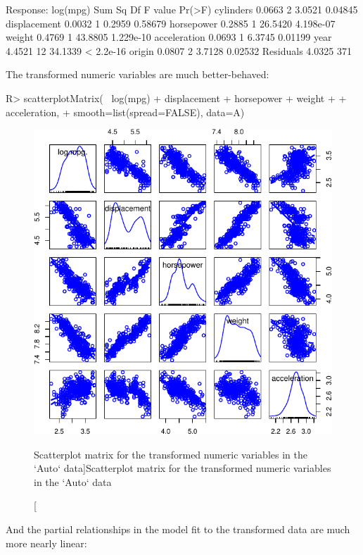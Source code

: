\documentclass[
]{jss}
\begin{document}
\begin{CodeChunk}
\begin{CodeOutput}
Response: log(mpg)
             Sum Sq  Df F value    Pr(>F)
cylinders    0.0663   2  3.0521   0.04845
displacement 0.0032   1  0.2959   0.58679
horsepower   0.2885   1 26.5420 4.198e-07
weight       0.4769   1 43.8805 1.229e-10
acceleration 0.0693   1  6.3745   0.01199
year         4.4521  12 34.1339 < 2.2e-16
origin       0.0807   2  3.7128   0.02532
Residuals    4.0325 371                  
\end{CodeOutput}
\end{CodeChunk}

The transformed numeric variables are much better-behaved:

\begin{CodeChunk}
\begin{CodeInput}
R> scatterplotMatrix(~ log(mpg) + displacement + horsepower + weight 
+                   + acceleration, 
+                   smooth=list(spread=FALSE), data=A)
\end{CodeInput}
\begin{figure}

{\centering \includegraphics[width=0.6\linewidth]{JSS-article-reduced_files/figure-latex/Auto-transformed-scatterplot-matrix-1} 

}

\caption[Scatterplot matrix for the transformed numeric variables in the `Auto` data]{Scatterplot matrix for the transformed numeric variables in the `Auto` data}\label{fig:Auto-transformed-scatterplot-matrix}
\end{figure}
\end{CodeChunk}

And the partial relationships in the model fit to the transformed data
are much more nearly linear:
\end{document}

